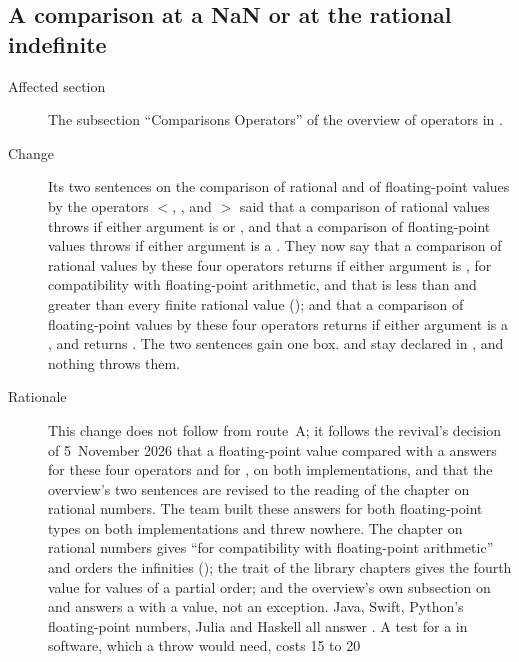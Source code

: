 \subsection{A comparison at a NaN or at the rational indefinite}

\begin{description}
\item[Affected section] The subsection ``Comparisons Operators'' of the
overview of operators in .
\item[Change] Its two sentences on the comparison of rational and of
floating-point values by the operators $<$, \EXP{\leq}, \EXP{\geq} and $>$
said that a comparison of rational values throws
 if either argument is  or ,
and that a comparison of floating-point values throws
 if either argument is a .
They now say that a comparison of rational values by these four operators
returns  if either argument is , for compatibility with
floating-point arithmetic, and that  is less than and 
greater than every finite rational value (); and that a
comparison of floating-point values by these four operators returns
 if either argument is a , and  returns
.
The two sentences gain one box.
 and  stay declared in
\library, and nothing throws them.
\item[Rationale] This change does not follow from route~A; it follows the
revival's decision of 5~November 2026 that a floating-point value compared with
a  answers  for these four operators and  for
, on both implementations, and that the overview's two sentences are
revised to the reading of the chapter on rational numbers.
The team built these answers for both floating-point types on both
implementations and threw  nowhere.
The chapter on rational numbers gives   ``for
compatibility with floating-point arithmetic'' and orders the infinities
(); the trait  of the library chapters
gives  the fourth value  for values of a partial order;
and the overview's own subsection on  and  answers a
 with a value, not an exception.
Java, Swift, Python's floating-point numbers, Julia and Haskell all answer
.
A test for a  in software, which a throw would need, costs 15 to 20

\end{description}
